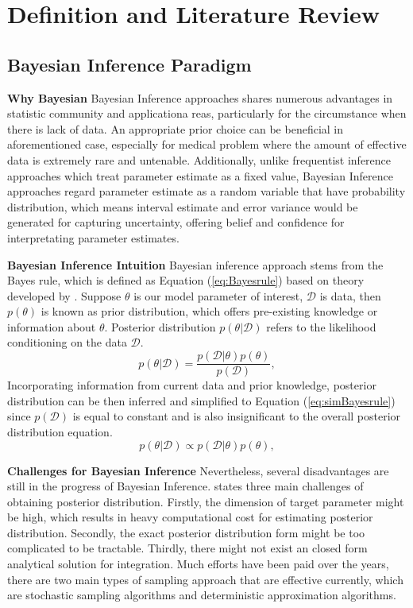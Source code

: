 \chapter{Definition and Literature Review}
\label{Chapter2}
\section{Bayesian Inference Paradigm}
\textbf{Why Bayesian}
Bayesian Inference approaches shares numerous advantages in statistic community and applicationa reas, particularly for the circumstance when there is lack of data. An appropriate prior choice can be beneficial in aforementioned case, especially for medical problem where the amount of effective data is extremely rare and untenable. Additionally, unlike frequentist inference approaches which treat parameter estimate as a fixed value, Bayesian Inference approaches regard parameter estimate as a random variable that have probability distribution, which means interval estimate and error variance would be generated for capturing uncertainty, offering  belief and confidence for interpretating parameter estimates.

\textbf{Bayesian Inference Intuition}
Bayesian inference approach stems from the Bayes rule, which is defined as Equation (\ref{eq:Bayesrule}) based on theory developed by \cite{Beech1959}. Suppose $\theta$ is our model parameter of interest, $\mathcal{D}$ is data, then $p(\theta)$ is known as prior distribution, which offers pre-existing knowledge or information about $\theta$. Posterior distribution $p(\theta|\mathcal{D})$ refers to the likelihood conditioning on the data $\mathcal{D}$.
\begin{equation}
	p(\theta|\mathcal{D}) = \frac{p(\mathcal{D}|\theta)p(\theta)}{p(\mathcal{D})},
	\label{eq:Bayesrule}
\end{equation}
Incorporating information from current data and prior knowledge, posterior distribution can be then inferred and simplified to Equation (\ref{eq:simBayesrule}) since $p(\mathcal{D})$ is equal to constant and is also insignificant to the overall posterior distribution equation.
\begin{equation}
	p(\theta|\mathcal{D}) \propto p(\mathcal{D}|\theta)p(\theta),
	\label{eq:simBayesrule}
\end{equation}

\textbf{Challenges for Bayesian Inference}
Nevertheless, several disadvantages are still in the progress of Bayesian Inference. \cite{bishop_2006} states three main challenges of obtaining posterior distribution. Firstly, the dimension of target parameter might be high, which results in heavy computational cost for estimating posterior distribution. Secondly, the exact posterior distribution form might be too complicated to be tractable. Thirdly, there might not exist an closed form analytical solution for integration. Much efforts have been paid over the years, there are two main types of sampling approach that are effective currently, which are stochastic sampling algorithms and deterministic approximation algorithms. 


